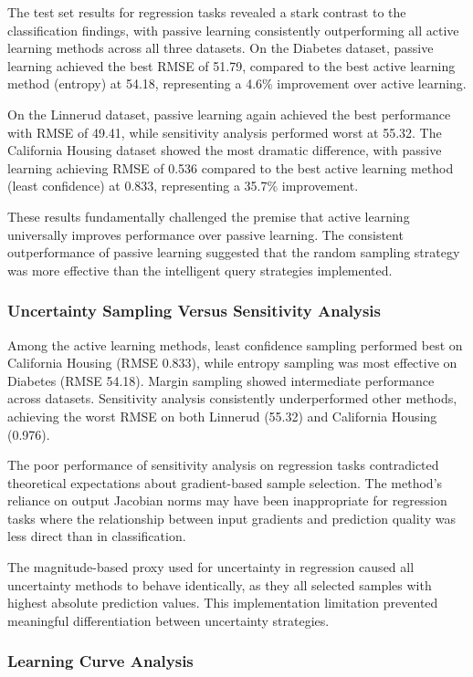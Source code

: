 \documentclass[conference]{IEEEtran}
\begin{document}
The test set results for regression tasks revealed a stark contrast to the classification findings, with passive learning consistently outperforming all active learning methods across all three datasets. On the Diabetes dataset, passive learning achieved the best RMSE of 51.79, compared to the best active learning method (entropy) at 54.18, representing a 4.6\% improvement over active learning.

On the Linnerud dataset, passive learning again achieved the best performance with RMSE of 49.41, while sensitivity analysis performed worst at 55.32. The California Housing dataset showed the most dramatic difference, with passive learning achieving RMSE of 0.536 compared to the best active learning method (least confidence) at 0.833, representing a 35.7\% improvement.

These results fundamentally challenged the premise that active learning universally improves performance over passive learning. The consistent outperformance of passive learning suggested that the random sampling strategy was more effective than the intelligent query strategies implemented.

\subsubsection{Uncertainty Sampling Versus Sensitivity Analysis}

Among the active learning methods, least confidence sampling performed best on California Housing (RMSE 0.833), while entropy sampling was most effective on Diabetes (RMSE 54.18). Margin sampling showed intermediate performance across datasets. Sensitivity analysis consistently underperformed other methods, achieving the worst RMSE on both Linnerud (55.32) and California Housing (0.976).

The poor performance of sensitivity analysis on regression tasks contradicted theoretical expectations about gradient-based sample selection. The method's reliance on output Jacobian norms may have been inappropriate for regression tasks where the relationship between input gradients and prediction quality was less direct than in classification.

The magnitude-based proxy used for uncertainty in regression caused all uncertainty methods to behave identically, as they all selected samples with highest absolute prediction values. This implementation limitation prevented meaningful differentiation between uncertainty strategies.

\subsubsection{Learning Curve Analysis}
\end{document}
